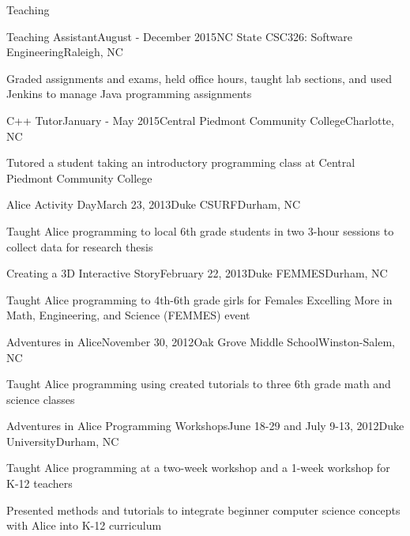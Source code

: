 \documentclass{resume} %
\begin{document}
\begin{rSection}{Teaching}
\begin{rSubsection}{Teaching Assistant}{August - December 2015}{NC State CSC326: Software Engineering}{Raleigh, NC}
\item Graded assignments and exams, held office hours, taught lab sections, and used Jenkins to manage Java programming assignments
\end{rSubsection}
\vspace{-5pt}

\begin{rSubsection}{C++ Tutor}{January - May 2015}{Central Piedmont Community College}{Charlotte, NC}
\item Tutored a student taking an introductory programming class at Central Piedmont Community College
\end{rSubsection}
\vspace{-5pt}

\begin{rSubsection}{Alice Activity Day}{March 23, 2013}{Duke CSURF}{Durham, NC}
\item Taught Alice programming to local 6th grade students in two 3-hour sessions to collect data for research thesis
\end{rSubsection}
\vspace{-5pt}


\begin{rSubsection}{Creating a 3D Interactive Story}{February 22, 2013}{Duke FEMMES}{Durham, NC}
\item Taught Alice programming to 4th-6th grade girls for Females Excelling More in Math, Engineering, and Science (FEMMES) event
\end{rSubsection}
\vspace{-5pt}


\begin{rSubsection}{Adventures in Alice}{November 30, 2012}{Oak Grove Middle School}{Winston-Salem, NC}
\item Taught Alice programming using created tutorials to three 6th grade math and science classes
\end{rSubsection}
\vspace{-5pt}

\begin{rSubsection}{Adventures in Alice Programming Workshops}{June 18-29 and July 9-13, 2012}{Duke University}{Durham, NC}
\item Taught Alice programming at a two-week workshop and a 1-week workshop for K-12 teachers 
\item Presented methods and tutorials to integrate beginner computer science concepts with Alice into K-12 curriculum
\end{rSubsection}

\end{rSection}
\end{document}
